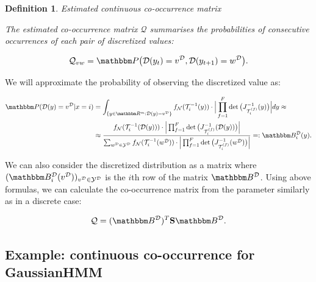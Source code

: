 \documentclass[shortabstract]{iithesis}
\newtheorem{definition}{Definition}
\begin{document}
\begin{definition}{Estimated continuous co-occurrence matrix}

The estimated co-occurrence matrix $\mathcal{Q}$ summarises  the probabilities of consecutive occurrences of each pair of discretized values: 

\begin{equation}\label{eq:c_cooc_mat}
    \mathcal{Q}_{vw} = \mathbbm P \big(\mathcal D(y_t) =  v^{\mathcal D}, \mathcal D(y_{t+1}) = w ^{\mathcal D}\big) \text{.}
\end{equation}
\end{definition}

We will approximate the probability of observing the discretized value as:

\begin{equation*}
\begin{aligned}
     \mathbbm P (\mathcal D (y) = v^{\mathcal D} | x = i) 
    & = \int_{\{y\in \mathbbm R^m: \mathcal D (y) = v^{\mathcal D} \}} 
    f_{\mathcal N} (\mathcal T_i^{-1}(y)) \cdot \Big| \prod_{f=1}^F \det \big(J^{-1}_{\mathcal T_i^{(f)}}(y)\big) \Big|
    dy
    \approx \\
    & \approx \frac{
    f_{\mathcal N} (\mathcal T_i^{-1}(\mathcal D (y))) \cdot \Big| \prod_{f=1}^F \det \big(J^{-1}_{\mathcal T_i^{(f)}}(\mathcal D (y))\big) \Big|
    }{
    \sum_{w^{\mathcal D} \in \mathcal{Y^{\mathcal D}}}
    f_{\mathcal N} (\mathcal T_i^{-1}(w^{\mathcal D})) \cdot \Big| \prod_{f=1}^F \det \big(J^{-1}_{\mathcal T_i^{(f)}}(w^{\mathcal D})\big) \Big|
    } =: \mathbbm B_i^{\mathcal D}(y)\text{.}
\end{aligned}
\end{equation*} 

We can also consider the discretized distribution as a matrix where $(\mathbbm B_i^{\mathcal D}(v^{\mathcal D}))_{v^{\mathcal D} \in \mathcal Y ^{\mathcal D}}$ is the $i$th row of the matrix $\mathbbm B^{\mathcal D}$. Using above formulas, we can calculate the co-occurrence matrix from the parameter similarly as in a discrete case:

\begin{equation}\label{eq:c_cooc_fact}
    \mathcal{Q} = (\mathbbm B ^{\mathcal D})^T \textbf{S} \mathbbm B^{\mathcal D}\text{.}
\end{equation}


\subsection{Example: continuous co-occurrence for GaussianHMM}
\end{document}
